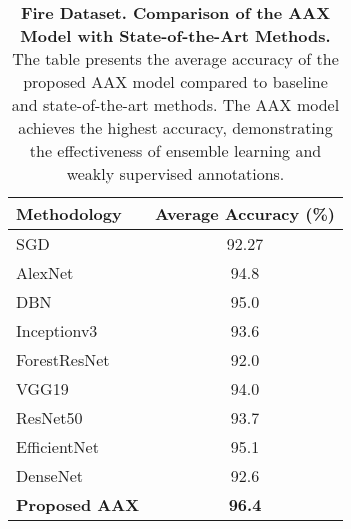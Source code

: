 
\begin{table}[!h]
\centering
\caption{\textbf{Fire Dataset. Comparison of the AAX Model with State-of-the-Art Methods.} The table presents the average accuracy of the proposed AAX model compared to baseline and state-of-the-art methods. The AAX model achieves the highest accuracy, demonstrating the effectiveness of ensemble learning and weakly supervised annotations.}
\label{tab:acc_performance_fire}
\begin{tabular}{@{}lc@{}}
\toprule
\textbf{Methodology} & \textbf{Average Accuracy (\%)} \\ \midrule
SGD \cite{ref43}            & 92.27                         \\
AlexNet \cite{ref44}        & 94.8                          \\
DBN \cite{ref45}           & 95.0                          \\
Inceptionv3 \cite{ref46}     & 93.6                          \\
ForestResNet \cite{ref47}    & 92.0                          \\
VGG19 \cite{ref48}        & 94.0                          \\
ResNet50             & 93.7                          \\
EfficientNet         & 95.1                          \\
DenseNet             & 92.6                          \\
\textbf{Proposed AAX}   & \textbf{96.4}                          \\ \bottomrule
\end{tabular}
\end{table}



